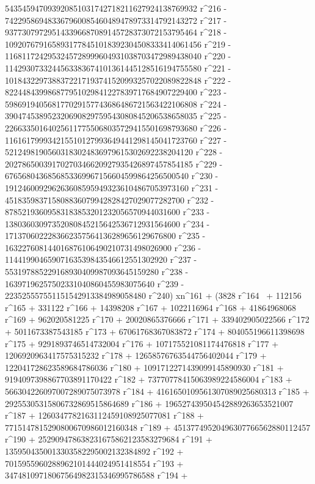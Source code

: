        543545947093920851031742718211627924138769932 r^216 - 
       742295869483367960085460489478973314792143272 r^217 - 
       937730797295143396687089145728373072153795464 r^218 - 
       1092076791658931778451018392304508333414061456 r^219 - 
       1168117242953245728999604931038703472989438040 r^220 - 
       1142930733244563383674101361445128516194755580 r^221 - 
       1018432297388372217193741520993257022089822848 r^222 - 
       822448439986877951029841227839717684907229400 r^223 - 
       598691940568177029157743686486721563422106808 r^224 - 
       390474538952320690829759543080845206538658035 r^225 - 
       226633501640256117755068035729415501698793680 r^226 - 
       116161799934215510127993649441298145041723760 r^227 - 
       52124981905603183024836979615302692238204120 r^228 - 
       20278650039170270346620927935426897457854185 r^229 - 
       6765680436856853369967156604599864256500540 r^230 - 
       1912460092962636085959493236104867053973160 r^231 - 
       451835983715808836079942828427029077282700 r^232 - 
       87852193609583183853201232056570944031600 r^233 - 
       13803603097352080845215642536712931564600 r^234 - 
       1713706022283662357564136289656129676800 r^235 - 
       163227608144016876106490210731498026900 r^236 - 
       11441990465907163539843546612551302920 r^237 - 
       553197885229168930409987093645159280 r^238 - 
       16397196257502331040860455983075640 r^239 - 
       223525557551151542913384989058480 r^240) xn^161 + (3828 r^164 \
+ 112156 r^165 + 331122 r^166 + 14398208 r^167 + 1022116964 r^168 + 
       41864968068 r^169 + 962020581225 r^170 + 
       20020865376666 r^171 + 339402905022566 r^172 + 
       5011673387543185 r^173 + 67061768367083872 r^174 + 
       804055196611398698 r^175 + 9291893746514732004 r^176 + 
       107175521081174476818 r^177 + 1206920963417575315232 r^178 + 
       12658576763544756402044 r^179 + 
       122041728623589684786036 r^180 + 
       1091712271439099145890930 r^181 + 
       9194097398867703891170422 r^182 + 
       73770778415063989224586004 r^183 + 
       566304226097007289075073978 r^184 + 
       4161650109561307089025680313 r^185 + 
       29255305315806732869515864689 r^186 + 
       196527439504542889263653521007 r^187 + 
       1260347782163112459108925077081 r^188 + 
       7715147815290800670986012160348 r^189 + 
       45137749520496307766562880112457 r^190 + 
       252909478638231675862123583279684 r^191 + 
       1359504350013303582295002132384892 r^192 + 
       7015955960288962101444024951418554 r^193 + 
       34748109718067564982315346995786588 r^194 + 
